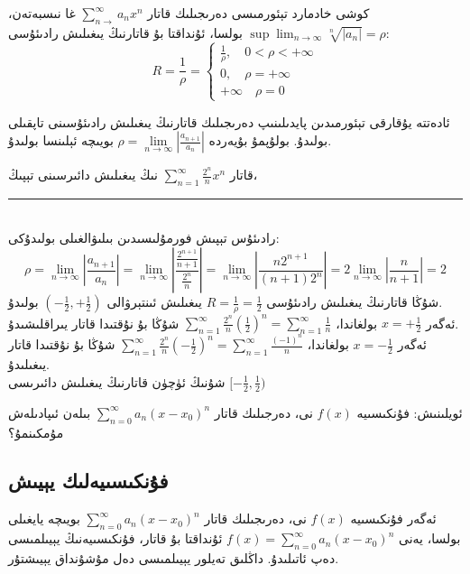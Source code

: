 \begin{MyTheorem}{كوشى خادمارد تېئورمىسى}{}%
	دەرىجىلىك قاتار
	$\sum\limits_{n \to}^\infty a_n x^n$
	غا نىسبەتەن،
	$\sup\lim_{n \to \infty} \sqrt[n]{|a_n|} = \rho$
	بولسا، ئۇنداقتا بۇ قاتارنىڭ يىغىلىش رادىئۇسى:\\
	$$R = \frac{1}{\rho} = 
	\begin{cases}
		\frac{1}{\rho}, \quad 0 < \rho < +\infty \\
		0, \quad \rho = +\infty \\
		+\infty \quad \rho = 0
	\end{cases}
    $$
\end{MyTheorem}
ئادەتتە يۇقارقى تېئورمىدىن پايدىلىنىپ دەرىجىلىك قاتارنىڭ يىغىلىش رادىئۇسىنى تاپقىلى بولىدۇ. بولۇپمۇ بۇيەردە 
$\rho = \lim\limits_{n \to \infty}|\frac{a_{n+1}}{a_n}|$
بويىچە ئېلىنسا بولىدۇ.
\begin{myexample}
	قاتار
$\sum\limits_{n=1}^\infty \frac{2^n}{n}x^n$
نىڭ يىغىلىش دائىرسىنى تېپىڭ،
	\\\rule{\linewidth}{0.05em}\\
	رادىئۇس تېپىش فورمۇلىسىدىن بىلىۋالغىلى بولىدۇكى:
	$$\rho 
	=\lim\limits_{n \to \infty} |\frac{a_{n+1}}{a_n}|
	=\lim\limits_{n \to \infty}|\frac{\frac{2^{n+1}}{n+1}}{\frac{2^n}{n}}|
	=\lim\limits_{n \to \infty}|\frac{n2^{n+1}}{(n+1)2^n}|
	=2\lim\limits_{n \to \infty}|\frac{n}{n+1}|=2
	$$
	شۇڭا قاتارنىڭ يىغىلىش رادىئۇسى 
	$R = \frac{1}{\rho} = \frac{1}{2}$
	يىغىلىش ئىنتېرۋالى 
	$(-\frac{1}{2}, +\frac{1}{2})$
بولىدۇ.\\
ئەگەر $x=+\frac{1}{2}$	 بولغاندا، 
$\sum\limits_{n=1}^\infty \frac{2^n}{n}(\frac{1}{2})^n = \sum\limits_{n=1}^\infty \frac{1}{n}$
شۇڭا بۇ نۇقتىدا قاتار يىراقلىشىدۇ.\\
ئەگەر $x=-\frac{1}{2}$	 بولغاندا، 
$\sum\limits_{n=1}^\infty \frac{2^n}{n}(-\frac{1}{2})^n = \sum\limits_{n=1}^\infty \frac{(-1)^n}{n}$
شۇڭا بۇ نۇقتىدا قاتار يىغىلىدۇ.\\
شۇنىڭ ئۈچۈن قاتارنىڭ يىغىلىش دائىرىسى
$[-\frac{1}{2}, \frac{1}{2} )$
\end{myexample}

\begin{colorful}[yellow]
	ئويلىنىش: فۇنكىسىيە
	$f(x)$
	نى، دەرجىلىك قاتار
	$\sum\limits_{n=0}^\infty a_n(x-x_0)^n$
	بىلەن ئىپادىلەش مۇمكىنمۇ؟
\end{colorful}

\subsection{فۇنكىسىيەلىك يېيىش}
ئەگەر فۇنكىسىيە 
$f(x)$
 نى، دەرىجىلىك قاتار
 $\sum\limits_{n=0}^\infty a_n(x-x_0)^n$
 بويىچە يايغىلى بولسا، يەنى
 $f(x) = \sum\limits_{n=0}^\infty a_n(x-x_0)^n $
 ئۇنداقتا بۇ قاتار، فۇنكىسىيەنىڭ يېيىلمىسى دەپ ئاتىلىدۇ. داڭلىق تەيلور يېيىلمىسى دەل مۇشۇنداق يېيىشتۇر.
 
